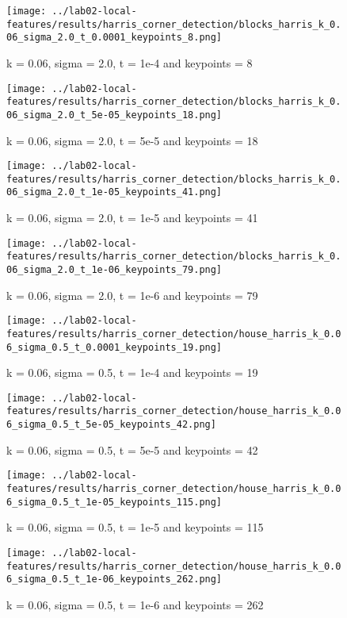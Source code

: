 \documentclass{ETHExercise}
\begin{document}
\begin{figure}[!h]
    \texttt{[image: ../lab02-local-features/results/harris\_corner\_detection/blocks\_harris\_k\_0.06\_sigma\_2.0\_t\_0.0001\_keypoints\_8.png]}
    \caption{k = 0.06, sigma = 2.0, t = 1e-4 and keypoints = 8}
  \endminipage\hfill
    \texttt{[image: ../lab02-local-features/results/harris\_corner\_detection/blocks\_harris\_k\_0.06\_sigma\_2.0\_t\_5e-05\_keypoints\_18.png]}
    \caption{k = 0.06, sigma = 2.0, t = 5e-5 and keypoints = 18}
  \endminipage\hfill
    \texttt{[image: ../lab02-local-features/results/harris\_corner\_detection/blocks\_harris\_k\_0.06\_sigma\_2.0\_t\_1e-05\_keypoints\_41.png]}
    \caption{k = 0.06, sigma = 2.0, t = 1e-5 and keypoints = 41}
  \endminipage\hfill
    \texttt{[image: ../lab02-local-features/results/harris\_corner\_detection/blocks\_harris\_k\_0.06\_sigma\_2.0\_t\_1e-06\_keypoints\_79.png]}
    \caption{k = 0.06, sigma = 2.0, t = 1e-6 and keypoints = 79}
  \endminipage
\end{figure}
\begin{figure}[!h]
      \texttt{[image: ../lab02-local-features/results/harris\_corner\_detection/house\_harris\_k\_0.06\_sigma\_0.5\_t\_0.0001\_keypoints\_19.png]}
      \caption{k = 0.06, sigma = 0.5, t = 1e-4 and keypoints = 19}
    \endminipage\hfill
      \texttt{[image: ../lab02-local-features/results/harris\_corner\_detection/house\_harris\_k\_0.06\_sigma\_0.5\_t\_5e-05\_keypoints\_42.png]}
      \caption{k = 0.06, sigma = 0.5, t = 5e-5 and keypoints = 42}
    \endminipage\hfill
      \texttt{[image: ../lab02-local-features/results/harris\_corner\_detection/house\_harris\_k\_0.06\_sigma\_0.5\_t\_1e-05\_keypoints\_115.png]}
      \caption{k = 0.06, sigma = 0.5, t = 1e-5 and keypoints = 115}
    \endminipage\hfill
      \texttt{[image: ../lab02-local-features/results/harris\_corner\_detection/house\_harris\_k\_0.06\_sigma\_0.5\_t\_1e-06\_keypoints\_262.png]}
      \caption{k = 0.06, sigma = 0.5, t = 1e-6 and keypoints = 262}
    \endminipage
  \end{figure}
\end{document}
